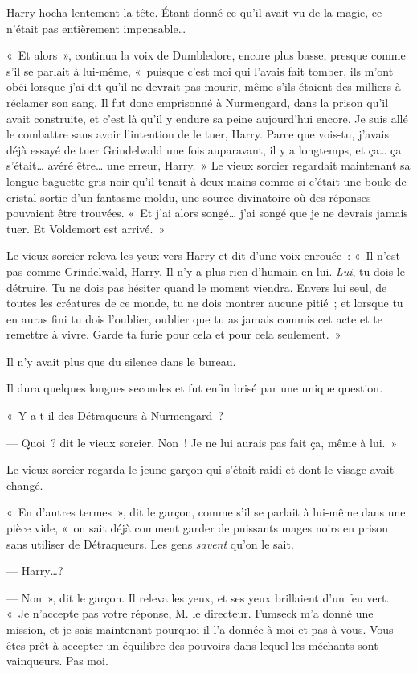Harry hocha lentement la tête. Étant donné ce qu'il avait vu de la magie, ce n'était pas entièrement impensable…

«~Et alors~», continua la voix de Dumbledore, encore plus basse, presque comme s'il se parlait à lui-même, «~puisque c'est moi qui l'avais fait tomber, ils m'ont obéi lorsque j'ai dit qu'il ne devrait pas mourir, même s'ils étaient des milliers à réclamer son sang. Il fut donc emprisonné à Nurmengard, dans la prison qu'il avait construite, et c'est là qu'il y endure sa peine aujourd'hui encore. Je suis allé le combattre sans avoir l'intention de le tuer, Harry. Parce que vois-tu, j'avais déjà essayé de tuer Grindelwald une fois auparavant, il y a longtemps, et ça… ça s'était… avéré être… une erreur, Harry.~» Le vieux sorcier regardait maintenant sa longue baguette gris-noir qu'il tenait à deux mains comme si c'était une boule de cristal sortie d'un fantasme moldu, une source divinatoire où des réponses pouvaient être trouvées. «~Et j'ai alors songé… j'ai songé que je ne devrais jamais tuer. Et Voldemort est arrivé.~»

Le vieux sorcier releva les yeux vers Harry et dit d'une voix enrouée~: «~Il n'est pas comme Grindelwald, Harry. Il n'y a plus rien d'humain en lui. \emph{Lui}, tu dois le détruire. Tu ne dois pas hésiter quand le moment viendra. Envers lui seul, de toutes les créatures de ce monde, tu ne dois montrer aucune pitié~; et lorsque tu en auras fini tu dois l'oublier, oublier que tu as jamais commis cet acte et te remettre à vivre. Garde ta furie pour cela et pour cela seulement.~»

Il n'y avait plus que du silence dans le bureau.

Il dura quelques longues secondes et fut enfin brisé par une unique question.

«~Y a-t-il des Détraqueurs à Nurmengard~?

--- Quoi~? dit le vieux sorcier. Non~! Je ne lui aurais pas fait ça, même à lui.~»

\later

Le vieux sorcier regarda le jeune garçon qui s'était raidi et dont le visage avait changé.

«~En d'autres termes~», dit le garçon, comme s'il se parlait à lui-même dans une pièce vide, «~on sait déjà comment garder de puissants mages noirs en prison sans utiliser de Détraqueurs. Les gens \emph{savent} qu'on le sait.

--- Harry…?

--- Non~», dit le garçon. Il releva les yeux, et ses yeux brillaient d'un feu vert. «~Je n'accepte pas votre réponse, M. le directeur. Fumseck m'a donné une mission, et je sais maintenant pourquoi il l'a donnée à moi et pas à vous. Vous êtes prêt à accepter un équilibre des pouvoirs dans lequel les méchants sont vainqueurs. Pas moi.

